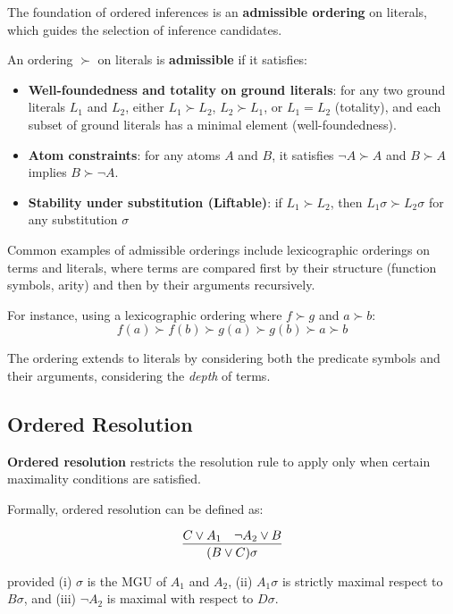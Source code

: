 The foundation of ordered inferences is an \textbf{admissible ordering} on literals, which guides the selection of inference candidates.

An ordering \(\succ\) on literals is \textbf{admissible} if it satisfies:
\begin{itemize}
    \item \textbf{Well-foundedness and totality on ground literals}: for any two ground literals \(L_1\) and \(L_2\), either \(L_1 \succ L_2\), \(L_2 \succ L_1\), or \(L_1 = L_2\) (totality), and each subset of ground literals has a minimal element (well-foundedness).
    \item \textbf{Atom constraints}: for any atoms \(A\) and \(B\), it satisfies \(\neg A \succ A\) and \(B \succ A\) implies \(B \succ \neg A\).
    \item \textbf{Stability under substitution (Liftable)}: if \(L_1 \succ L_2\), then \(L_1\sigma \succ L_2\sigma\) for any substitution \(\sigma\)
\end{itemize}

Common examples of admissible orderings include lexicographic orderings on terms and literals, where terms are compared first by their structure (function symbols, arity) and then by their arguments recursively.

For instance, using a lexicographic ordering where \(f \succ g\) and \(a \succ b\):
\[f(a) \succ f(b) \succ g(a) \succ g(b) \succ a \succ b\]

The ordering extends to literals by considering both the predicate symbols and their arguments, considering the \emph{depth} of terms.

\subsection{Ordered Resolution}

\textbf{Ordered resolution} restricts the resolution rule to apply only when certain maximality conditions are satisfied.

Formally, ordered resolution can be defined as:

  \begin{equation}
    \infer{(B\lor C)\sigma}{C\lor A_1 & \neg A_2 \lor B}
  \end{equation}
  
  \indent provided (i) \(\sigma\) is the MGU of \(A_1\) and \(A_2\), (ii) \(A_1\sigma\) is strictly maximal respect to \(B\sigma\), and \indent (iii) \(\neg A_2\) is maximal with respect to \(D\sigma\).



